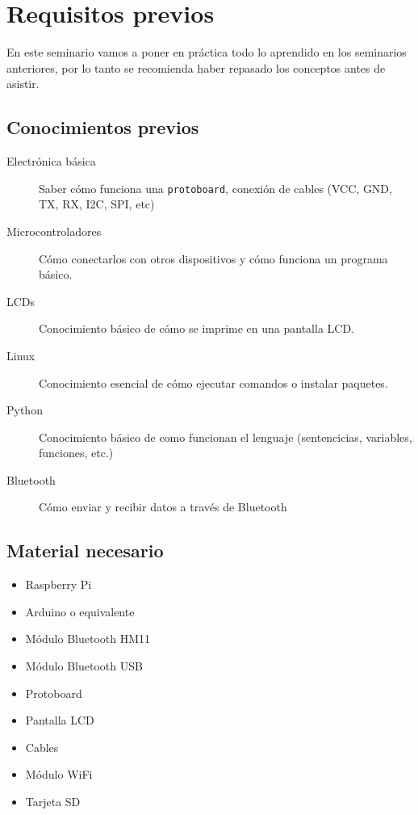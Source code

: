 \section{Requisitos previos}

En este seminario vamos a poner en práctica todo lo aprendido en los
seminarios anteriores, por lo tanto se recomienda haber repasado los
conceptos antes de asistir.

\subsection{Conocimientos previos}

\begin{description}
	\item[Electrónica básica] Saber cómo funciona una \texttt{protoboard},
	conexión de cables (VCC, GND, TX, RX, I2C, SPI, etc)
	\item[Microcontroladores] Cómo conectarlos con otros dispositivos y cómo
	funciona un programa básico.
	\item[LCDs] Conocimiento básico de cómo se imprime en una pantalla LCD.
	\item[Linux] Conocimiento esencial de cómo ejecutar comandos o instalar
	paquetes.
	\item[Python] Conocimiento básico de como funcionan el lenguaje
	(sentencicias, variables, funciones, etc.)
	\item[Bluetooth] Cómo enviar y recibir datos a través de Bluetooth
\end{description}

\subsection{Material necesario}

\begin{itemize}
	\item Raspberry Pi
	\item Arduino o equivalente
	\item Módulo Bluetooth HM11
	\item Módulo Bluetooth USB
	\item Protoboard
	\item Pantalla LCD
	\item Cables
	\item Módulo WiFi
	\item Tarjeta SD
\end{itemize}


